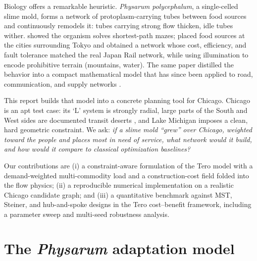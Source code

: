 \documentclass[11pt]{article}
\begin{document}
Biology offers a remarkable heuristic. \emph{Physarum polycephalum}, a single-celled
slime mold, forms a network of protoplasm-carrying tubes between food sources and
continuously remodels it: tubes carrying strong flow thicken, idle tubes wither.
\citet{nakagaki2000} showed the organism solves shortest-path mazes; \citet{tero2010}
placed food sources at the cities surrounding Tokyo and obtained a network whose cost,
efficiency, and fault tolerance matched the real Japan Rail network, while using
illumination to encode prohibitive terrain (mountains, water). The same paper distilled
the behavior into a compact mathematical model that has since been applied to road,
communication, and supply networks \citep{tero2007,watanabe2014,sun2017}.

This report builds that model into a concrete planning tool for Chicago. Chicago is an
apt test case: its `L' system is strongly radial, large parts of the South and West
sides are documented transit deserts \citep{transitdesert2025}, and Lake Michigan
imposes a clean, hard geometric constraint. We ask: \emph{if a slime mold ``grew''
over Chicago, weighted toward the people and places most in need of service, what
network would it build, and how would it compare to classical optimization baselines?}

Our contributions are (i) a constraint-aware formulation of the Tero model with a
demand-weighted multi-commodity load and a construction-cost field folded into the
flow physics; (ii) a reproducible numerical implementation on a realistic Chicago
candidate graph; and (iii) a quantitative benchmark against MST, Steiner, and
hub-and-spoke designs in the Tero cost--benefit framework, including a parameter
sweep and multi-seed robustness analysis.

\section{The \emph{Physarum} adaptation model}
\end{document}
